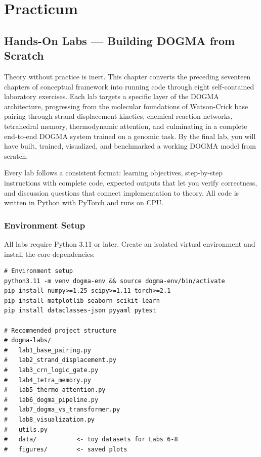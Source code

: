 
\part{Practicum}

\chapter{Hands-On Labs --- Building DOGMA from Scratch}
\label{ch:labs}


\noindent
Theory without practice is inert. This chapter converts the preceding seventeen chapters of conceptual framework into running code through eight self-contained laboratory exercises. Each lab targets a specific layer of the DOGMA architecture, progressing from the molecular foundations of Watson-Crick base pairing through strand displacement kinetics, chemical reaction networks, tetrahedral memory, thermodynamic attention, and culminating in a complete end-to-end DOGMA system trained on a genomic task. By the final lab, you will have built, trained, visualized, and benchmarked a working DOGMA model from scratch.

Every lab follows a consistent format: learning objectives, step-by-step instructions with complete code, expected outputs that let you verify correctness, and discussion questions that connect implementation to theory. All code is written in Python with PyTorch and runs on CPU.

\section{Environment Setup}
\label{sec:lab-setup}

All labs require Python 3.11 or later. Create an isolated virtual environment and install the core dependencies:

\begin{lstlisting}[style=dogmapython, caption={Environment setup and project layout.}]
# Environment setup
python3.11 -m venv dogma-env && source dogma-env/bin/activate
pip install numpy>=1.25 scipy>=1.11 torch>=2.1
pip install matplotlib seaborn scikit-learn
pip install dataclasses-json pyyaml pytest

# Recommended project structure
# dogma-labs/
#   lab1_base_pairing.py
#   lab2_strand_displacement.py
#   lab3_crn_logic_gate.py
#   lab4_tetra_memory.py
#   lab5_thermo_attention.py
#   lab6_dogma_pipeline.py
#   lab7_dogma_vs_transformer.py
#   lab8_visualization.py
#   utils.py
#   data/           <- toy datasets for Labs 6-8
#   figures/        <- saved plots
\end{lstlisting}

